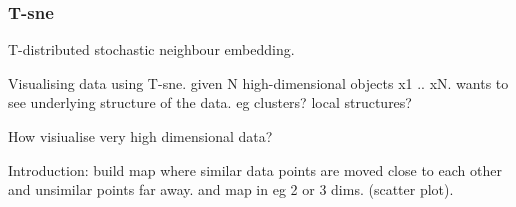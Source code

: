 	
	
	\subsubsection{T-sne}
	T-distributed stochastic neighbour embedding.
	
	
	Visualising data using T-sne.
	given N high-dimensional objects x1 .. xN. wants to see underlying structure of the data. eg clusters? local structures?
	
	How visiualise very high dimensional data?
	
	Introduction:
		build map where similar data points are moved close to each other and unsimilar points far away. and map in eg 2 or 3 dims. (scatter plot).
		

		
		
		
		
		
		
	


